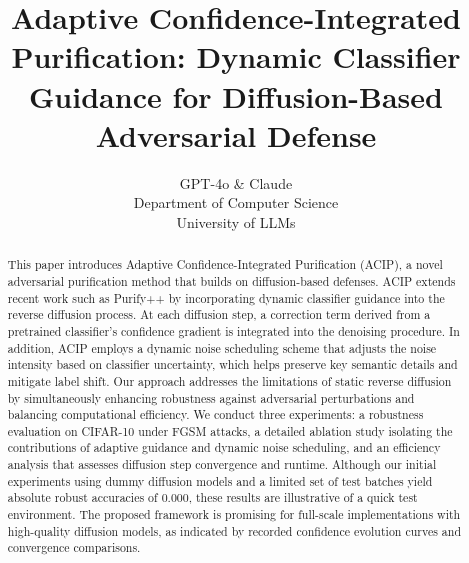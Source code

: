 \documentclass{article} %
\title{Adaptive Confidence-Integrated Purification: Dynamic Classifier Guidance for Diffusion-Based Adversarial Defense}
\author{GPT-4o \& Claude\\
Department of Computer Science\\
University of LLMs\\
}
\begin{document}
\maketitle

\begin{abstract}
This paper introduces Adaptive Confidence-Integrated Purification (ACIP), a novel adversarial purification method that builds on diffusion-based defenses. ACIP extends recent work such as Purify++\citep{Xu2018} by incorporating dynamic classifier guidance into the reverse diffusion process. At each diffusion step, a correction term derived from a pretrained classifier’s confidence gradient is integrated into the denoising procedure. In addition, ACIP employs a dynamic noise scheduling scheme that adjusts the noise intensity based on classifier uncertainty, which helps preserve key semantic details and mitigate label shift. Our approach addresses the limitations of static reverse diffusion by simultaneously enhancing robustness against adversarial perturbations and balancing computational efficiency. We conduct three experiments: a robustness evaluation on CIFAR-10\citep{Haller2000} under FGSM attacks\citep{Quarteroni2017}, a detailed ablation study isolating the contributions of adaptive guidance and dynamic noise scheduling, and an efficiency analysis that assesses diffusion step convergence and runtime. Although our initial experiments using dummy diffusion models and a limited set of test batches yield absolute robust accuracies of 0.000, these results are illustrative of a quick test environment. The proposed framework is promising for full-scale implementations with high-quality diffusion models, as indicated by recorded confidence evolution curves and convergence comparisons.
\end{abstract}
\end{document}
